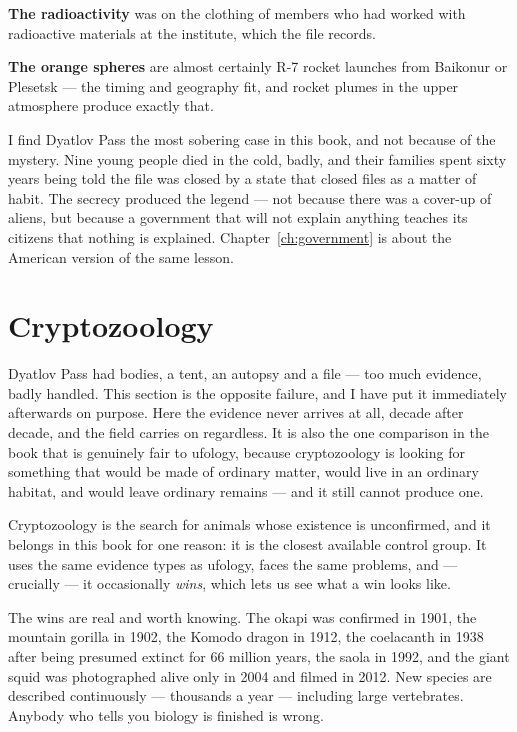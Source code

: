 \textbf{The radioactivity} was on the clothing of members who had worked with radioactive
materials at the institute, which the file records.

\textbf{The orange spheres} are almost certainly R-7 rocket launches from Baikonur or Plesetsk ---
the timing and geography fit, and rocket plumes in the upper atmosphere produce exactly that.

\begin{funfact}
I find Dyatlov Pass the most sobering case in this book, and not because of the mystery. Nine
young people died in the cold, badly, and their families spent sixty years being told the file
was closed by a state that closed files as a matter of habit. The secrecy produced the legend ---
not because there was a cover-up of aliens, but because a government that will not explain
anything teaches its citizens that nothing is explained. Chapter~\ref{ch:government} is about the American version
of the same lesson.
\end{funfact}

\section{Cryptozoology}\label{sec:cryptozoology}

Dyatlov Pass had bodies, a tent, an autopsy and a file --- too much evidence, badly handled.
This section is the opposite failure, and I have put it immediately afterwards on purpose.
Here the evidence never arrives at all, decade after decade, and the field carries on regardless.
It is also the one comparison in the book that is genuinely fair to ufology, because
cryptozoology is looking for something that would be made of ordinary matter, would live in an
ordinary habitat, and would leave ordinary remains --- and it still cannot produce one.

Cryptozoology is the search for animals whose existence is unconfirmed, and it belongs in this
book for one reason: it is the closest available control group. It uses the same evidence types as
ufology, faces the same problems, and --- crucially --- it occasionally \emph{wins}, which lets us
see what a win looks like.

The wins are real and worth knowing. The okapi was confirmed in 1901, the mountain gorilla in
1902, the Komodo dragon in 1912, the coelacanth in 1938 after being presumed extinct for 66
million years, the saola in 1992, and the giant squid was photographed alive only in 2004 and
filmed in 2012. New species are described continuously --- thousands a year --- including large
vertebrates. Anybody who tells you biology is finished is wrong.

